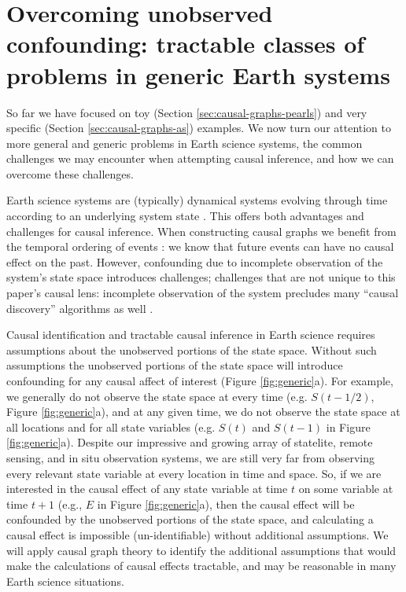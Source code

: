 \documentclass[12pt]{article}
\begin{document}
\section{Overcoming unobserved confounding: tractable classes of
  problems in generic Earth systems}
\label{sec:necess-cond-caus}

So far we have focused on toy (Section \ref{sec:causal-graphs-pearls})
and very specific (Section \ref{sec:causal-graphs-as}) examples. We
now turn our attention to more general and generic problems in Earth
science systems, the common challenges we may encounter when
attempting causal inference, and how we can overcome these challenges.

Earth science systems are (typically) dynamical systems evolving
through time according to an underlying system state
\citep{lorenz-1963,lorenz1996predictability,majda-state}. This offers
both advantages and challenges for causal inference. When constructing
causal graphs we benefit from the temporal ordering of events
\citep{runge2019inferring}: we know that future events can have no
causal effect on the past. However, confounding due to incomplete
observation of the system's state space introduces challenges;
challenges that are not unique to this paper's causal lens: incomplete
observation of the system precludes many ``causal discovery''
algorithms as well \citep[see][ for a great
review]{runge2019inferring}.

Causal identification and tractable causal inference in Earth science
requires assumptions about the unobserved portions of the state
space. Without such assumptions the unobserved portions of the state
space will introduce confounding for any causal affect of interest
(Figure \ref{fig:generic}a). For example, we generally do not observe
the state space at every time (e.g. $S(t-1/2)$, Figure
\ref{fig:generic}a), and at any given time, we do not observe the
state space at all locations and for all state variables (e.g. $S(t)$
and $S(t-1)$ in Figure \ref{fig:generic}a). Despite our impressive and
growing array of statelite, remote sensing, and in situ observation
systems, we are still very far from observing every relevant state
variable at every location in time and space.  So, if we are
interested in the causal effect of any state variable at time $t$ on
some variable at time $t+1$ (e.g., $E$ in Figure \ref{fig:generic}a),
then the causal effect will be confounded by the unobserved portions
of the state space, and calculating a causal effect is impossible
(un-identifiable) without additional assumptions. We will apply causal
graph theory to identify the additional assumptions that would make
the calculations of causal effects tractable, and may be reasonable in
many Earth science situations.
\end{document}
